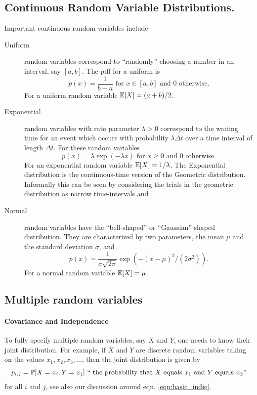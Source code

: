\subsection{Continuous Random Variable Distributions.}
Important continuous random variables include
\begin{description}
\item[Uniform] random variables correspond to ``randomly'' choosing a number in an interval, say $[a,b]$. The pdf for a uniform is 
\begin{equation}
p(x)=\frac{1}{b-a} \mbox{ for }x\in[a,b]\mbox{ and } 0 \mbox{ otherwise.}
\end{equation}
For a uniform random variable $\E[X]=(a+b)/2$.
\item[Exponential] random variables with rate parameter $\lambda>0$ correspond to the waiting time for an event which occurs with probability $\lambda \Delta t$ over a time interval of length $\Delta t$. For these random variables
\begin{equation}
p(x)= \lambda \exp(-\lambda x) \mbox{ for }x\ge 0 \mbox{ and } 0 \mbox{ otherwise.}
\end{equation}
For an exponential random variable $\E[X]=1/\lambda$. The Exponential
distribution is the continuous-time version of the Geometric
distribution. Informally this can be seen by considering the trials in
the geometric distribution as narrow time-intervals and 

\item[Normal] random variables have the ``bell-shaped'' or ``Gaussian'' shaped distribution. They are characterized by two parameters, the mean $\mu$ and the standard deviation $\sigma$, and
\begin{equation}
p(x)=\frac{1}{\sigma\sqrt{2\pi}}\exp(-(x-\mu)^2/(2\sigma^2)).
\end{equation}
For a normal random variable $\E[X]=\mu$. 
\end{description}

\subsection*{Multiple random variables}

\paragraph{Covariance and Independence} To fully specify multiple random variables, say $X$ and $Y$, one needs to know their joint distribution. For example, if $X$ and $Y$ are discrete random variables taking on the values $x_1,x_2,x_3,\dots$, then the joint distribution is given by 
\begin{equation}
p_{i,j}=\P[X=x_i,Y=x_j] \mbox{ `` the probability that $X$ equals $x_1$ and $Y$ equals $x_2$''}
\end{equation}
for all $i$ and $j$, see also our discussion around eqn. \eqref{eqn:basic_indie}.

